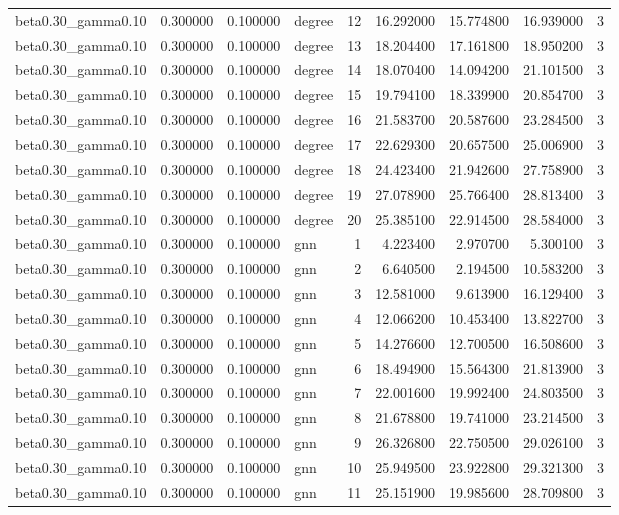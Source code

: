 \begin{tabular}{lrrlrrrrr}
beta0.30\_gamma0.10 & 0.300000 & 0.100000 & degree & 12 & 16.292000 & 15.774800 & 16.939000 & 3 \\
beta0.30\_gamma0.10 & 0.300000 & 0.100000 & degree & 13 & 18.204400 & 17.161800 & 18.950200 & 3 \\
beta0.30\_gamma0.10 & 0.300000 & 0.100000 & degree & 14 & 18.070400 & 14.094200 & 21.101500 & 3 \\
beta0.30\_gamma0.10 & 0.300000 & 0.100000 & degree & 15 & 19.794100 & 18.339900 & 20.854700 & 3 \\
beta0.30\_gamma0.10 & 0.300000 & 0.100000 & degree & 16 & 21.583700 & 20.587600 & 23.284500 & 3 \\
beta0.30\_gamma0.10 & 0.300000 & 0.100000 & degree & 17 & 22.629300 & 20.657500 & 25.006900 & 3 \\
beta0.30\_gamma0.10 & 0.300000 & 0.100000 & degree & 18 & 24.423400 & 21.942600 & 27.758900 & 3 \\
beta0.30\_gamma0.10 & 0.300000 & 0.100000 & degree & 19 & 27.078900 & 25.766400 & 28.813400 & 3 \\
beta0.30\_gamma0.10 & 0.300000 & 0.100000 & degree & 20 & 25.385100 & 22.914500 & 28.584000 & 3 \\
beta0.30\_gamma0.10 & 0.300000 & 0.100000 & gnn & 1 & 4.223400 & 2.970700 & 5.300100 & 3 \\
beta0.30\_gamma0.10 & 0.300000 & 0.100000 & gnn & 2 & 6.640500 & 2.194500 & 10.583200 & 3 \\
beta0.30\_gamma0.10 & 0.300000 & 0.100000 & gnn & 3 & 12.581000 & 9.613900 & 16.129400 & 3 \\
beta0.30\_gamma0.10 & 0.300000 & 0.100000 & gnn & 4 & 12.066200 & 10.453400 & 13.822700 & 3 \\
beta0.30\_gamma0.10 & 0.300000 & 0.100000 & gnn & 5 & 14.276600 & 12.700500 & 16.508600 & 3 \\
beta0.30\_gamma0.10 & 0.300000 & 0.100000 & gnn & 6 & 18.494900 & 15.564300 & 21.813900 & 3 \\
beta0.30\_gamma0.10 & 0.300000 & 0.100000 & gnn & 7 & 22.001600 & 19.992400 & 24.803500 & 3 \\
beta0.30\_gamma0.10 & 0.300000 & 0.100000 & gnn & 8 & 21.678800 & 19.741000 & 23.214500 & 3 \\
beta0.30\_gamma0.10 & 0.300000 & 0.100000 & gnn & 9 & 26.326800 & 22.750500 & 29.026100 & 3 \\
beta0.30\_gamma0.10 & 0.300000 & 0.100000 & gnn & 10 & 25.949500 & 23.922800 & 29.321300 & 3 \\
beta0.30\_gamma0.10 & 0.300000 & 0.100000 & gnn & 11 & 25.151900 & 19.985600 & 28.709800 & 3 \\

\end{tabular}

